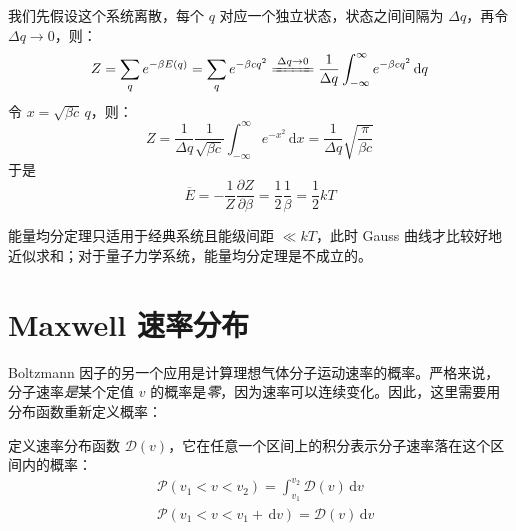 我们先假设这个系统离散，每个 $q$ 对应一个独立状态，状态之间间隔为 $\Delta q$，再令 $\Delta q \to 0$，则：
\begin{equation}
    Z
    =\sum_q e^{-\beta E(q)}
    =\sum_q e^{-\beta cq^2}
    \xlongequal{\Delta q\to 0} \frac{1}{\Delta q}\int_{-\infty}^{\infty}e^{-\beta cq^2}\,\mathrm{d}q
\end{equation}
令 $x=\sqrt{\beta c}\,q$，则：
\begin{equation}
Z
=\frac{1}{\Delta q}\frac{1}{\sqrt{\beta c}}\int_{-\infty}^{\infty}e^{-x^2}\,\mathrm{d}x
=\frac{1}{\Delta q}\sqrt{\frac{\pi}{\beta c}}
\end{equation}
于是
\begin{equation}
\overline E=-\frac{1}{Z}\frac{\partial Z}{\partial \beta}
=\frac{1}{2}\frac{1}{\beta}=\frac{1}{2}kT
\end{equation}

\begin{remark}
    能量均分定理只适用于经典系统且能级间距 $\ll kT$，此时 Gauss 曲线才比较好地近似求和；对于量子力学系统，能量均分定理是不成立的。
\end{remark}

\section{Maxwell 速率分布}
Boltzmann 因子的另一个应用是计算理想气体分子运动速率的概率。严格来说，分子速率\textit{是}某个定值 $v$ 的概率是\textit{零}，因为速率可以连续变化。因此，这里需要用分布函数重新定义概率：
\begin{definition}[分布函数与概率]
    定义速率分布函数 $\mathcal{D}(v)$，它在任意一个区间上的积分表示分子速率落在这个区间内的概率：
    \begin{align}
        & \mathcal{P}(v_1<v<v_2) = \int_{v_1}^{v_2}\mathcal{D}(v)\,\mathrm{d}v\\
        & \mathcal{P}(v_1<v<v_1+\,\mathrm{d}v) = \mathcal{D}(v)\,\mathrm{d}v
    \end{align}
\end{definition}

